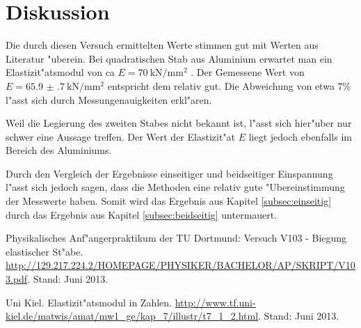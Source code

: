 \section{Diskussion}
\label{sec:diskussion}
	Die durch diesen Versuch ermittelten Werte stimmen gut mit Werten aus Literatur "uberein.
	Bei quadratischen Stab aus Aluminium erwartet man ein Elastizit"atsmodul von ca $E = \SI{70}{\kilo \newton \per \milli \meter \squared}$ \cite{muenchen}.
	Der Gemessene Wert von $E = \SI{65.9(7)}{\kilo \newton \per \milli \meter \squared}$ entspricht dem relativ gut.
	Die Abweichung von etwa 7\% l"asst sich durch Messungenauigkeiten erkl"aren.

	Weil die Legierung des zweiten Stabes nicht bekannt ist, l"asst sich hier"uber nur schwer eine Aussage treffen.
	Der Wert der Elastizit"at $E$ liegt jedoch ebenfalls im Bereich des Aluminiums.

	Durch den Vergleich der Ergebnisse einseitiger und beidseitiger Einspannung l"asst sich jedoch sagen, dass die Methoden eine relativ gute "Ubereinstimmung der Messwerte haben.
	Somit wird das Ergebnis aus Kapitel \ref{subsec:einseitig} durch das Ergebnis aus Kapitel \ref{subsec:beidseitig} untermauert.
\begin{thebibliography}{9}

	 Physikalisches Anf"angerpraktikum der TU Dortmund: Versuch V103 - Biegung elastischer St"abe. \url{http://129.217.224.2/HOMEPAGE/PHYSIKER/BACHELOR/AP/SKRIPT/V103.pdf}. Stand: Juni 2013.

	 Uni Kiel. Elastizit"atsmodul in Zahlen. \url{http://www.tf.uni-kiel.de/matwis/amat/mw1_ge/kap_7/illustr/t7_1_2.html}. Stand: Juni 2013.
\end{thebibliography}